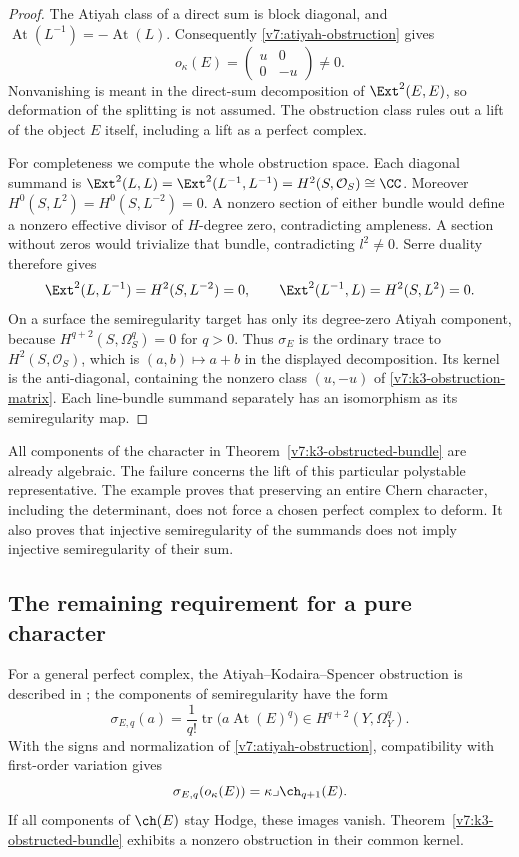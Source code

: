\begin{proof}
The Atiyah class of a direct sum is block diagonal, and
$\operatorname{At}(L^{-1})=-\operatorname{At}(L)$.  Consequently
\eqref{v7:atiyah-obstruction} gives
\begin{equation}\label{v7:k3-obstruction-matrix}
 o_{\kappa}(E)=
 \begin{pmatrix}u&0\\0&-u\end{pmatrix}\ne0.
\end{equation}
Nonvanishing is meant in the direct-sum decomposition of
$\Ext^2(E,E)$, so deformation of the splitting is not assumed.
The obstruction class rules out a lift of the object $E$ itself,
including a lift as a perfect complex.

For completeness we compute the whole obstruction space.  Each diagonal
summand is
$\Ext^2(L,L)=\Ext^2(L^{-1},L^{-1})=H^2(S,\mathcal O_S)\cong\CC$.
Moreover $H^0(S,L^2)=H^0(S,L^{-2})=0$.  A nonzero section of either
bundle would define a nonzero effective divisor of $H$-degree zero,
contradicting ampleness.  A section without zeros would trivialize that
bundle, contradicting $l^2\ne0$.  Serre duality therefore gives
\[
 \Ext^2(L,L^{-1})=H^2(S,L^{-2})=0,
 \qquad
 \Ext^2(L^{-1},L)=H^2(S,L^2)=0.
\]
On a surface the semiregularity target has only its degree-zero Atiyah
component, because $H^{q+2}(S,\Omega_S^q)=0$ for $q>0$.
Thus $\sigma_E$ is the ordinary trace to $H^2(S,\mathcal O_S)$,
which is $(a,b)\mapsto a+b$ in the displayed decomposition.
Its kernel is the anti-diagonal, containing the nonzero class $(u,-u)$
of \eqref{v7:k3-obstruction-matrix}.  Each line-bundle summand separately
has an isomorphism as its semiregularity map.
\end{proof}

All components of the character in Theorem~\ref{v7:k3-obstructed-bundle}
are already algebraic.  The failure concerns the lift of this particular
polystable representative.  The example proves that preserving an entire
Chern character, including the determinant, does not force a chosen
perfect complex to deform.  It also proves that injective semiregularity
of the summands does not imply injective semiregularity of their sum.

\subsection{The remaining requirement for a pure character}

For a general perfect complex, the Atiyah--Kodaira--Spencer obstruction is described in \cite{HT10}; the components of semiregularity have
the form
\[
 \sigma_{E,q}(a)=\frac{1}{q!}
    \operatorname{tr}\bigl(a\operatorname{At}(E)^q\bigr)
       \in H^{q+2}(Y,\Omega_Y^q).
\]
With the signs and normalization of \eqref{v7:atiyah-obstruction},
compatibility with first-order variation gives
\[
 \sigma_{E,q}(o_{\kappa}(E))
       =\kappa\lrcorner\ch_{q+1}(E).
\]
If all components of $\ch(E)$ stay Hodge, these images vanish.
Theorem~\ref{v7:k3-obstructed-bundle} exhibits a nonzero obstruction in
their common kernel.

